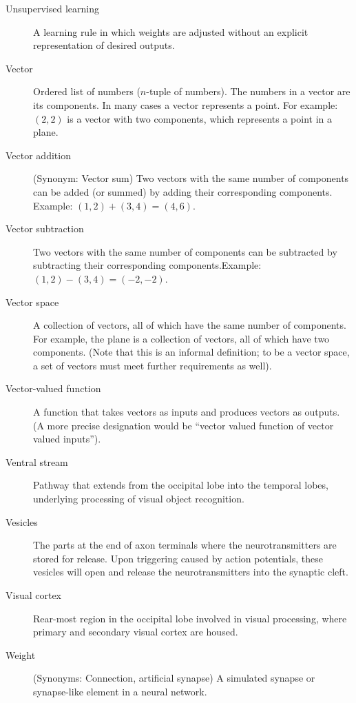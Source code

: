 \begin{description}
\item[Unsupervised learning] A learning rule in which weights are adjusted without an explicit representation of desired outputs.

\item[Vector] Ordered list of numbers ($n$-tuple of numbers). The numbers in a vector are its components. In many cases a vector represents a point. For example: $(2,2)$ is a vector with two components, which represents a point in a plane.

\item[Vector addition] (Synonym: Vector sum) Two vectors with the same number of components can be added (or summed) by adding their corresponding components. Example: $(1,2) + (3,4) = (4,6)$.

\item[Vector subtraction] Two vectors with the same number of components can be subtracted by subtracting their corresponding components.Example: $(1,2) - (3,4) = (-2,-2)$.

\item[Vector space] A collection of vectors, all of which have the same number of components. For example, the plane is a collection of vectors, all of which have two components. (Note that this is an  informal definition; to be a vector space, a set of vectors must meet further requirements as well).

\item[Vector-valued function] A function that takes vectors as inputs and produces vectors as outputs. (A more precise designation would be ``vector valued function of vector valued inputs''). 

\item[Ventral stream] Pathway that extends from the occipital lobe into the temporal lobes, underlying processing of visual object recognition. 

\item[Vesicles] The parts at the end of axon terminals where the neurotransmitters are stored for release. Upon triggering caused by action potentials, these vesicles will open and release the neurotransmitters into the synaptic cleft.

\item[Visual cortex] Rear-most region in the occipital lobe involved in visual processing, where primary and secondary visual cortex are housed.

\item[Weight] (Synonyms: Connection, artificial synapse) A simulated synapse or synapse-like element in a neural network. 


\end{description}
